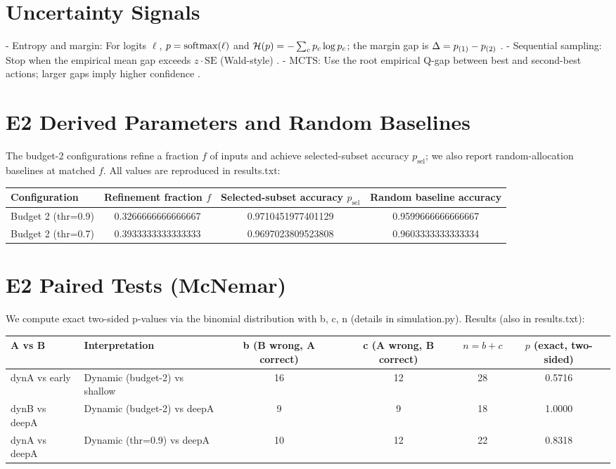 \appendix

\section{Uncertainty Signals}
\label{app:uncertainty}
- Entropy and margin: For logits $\ell$, $p=\mathrm{softmax}(\ell)$ and $\mathcal{H}(p)=-\sum_c p_c \log p_c$; the margin gap is $\Delta = p_{(1)}-p_{(2)}$ \cite{Guo2017Calibration,Kaya2019ShallowDeep}.
- Sequential sampling: Stop when the empirical mean gap exceeds $z \cdot \mathrm{SE}$ (Wald-style) \cite{Wald1945Sequential,Hoeffding1963}.
- MCTS: Use the root empirical Q-gap between best and second-best actions; larger gaps imply higher confidence \cite{Kocsis2006UCT,Coulom2006MCTS}.

\section{E2 Derived Parameters and Random Baselines}
\label{app:derived}
The budget-2 configurations refine a fraction $f$ of inputs and achieve selected-subset accuracy $p_{\mathrm{sel}}$; we also report random-allocation baselines at matched $f$. All values are reproduced in results.txt:
\begin{center}
\begin{adjustbox}{width=\linewidth}
\begin{tabular}{l c c c}
\toprule
Configuration & Refinement fraction $f$ & Selected-subset accuracy $p_{\mathrm{sel}}$ & Random baseline accuracy \\
\midrule
Budget 2 (thr=0.9) & 0.3266666666666667 & 0.9710451977401129 & 0.9599666666666667 \\
Budget 2 (thr=0.7) & 0.3933333333333333 & 0.9697023809523808 & 0.9603333333333334 \\
\bottomrule
\end{tabular}
\end{adjustbox}
\end{center}

\section{E2 Paired Tests (McNemar)}
We compute exact two-sided p-values via the binomial distribution with b, c, n (details in simulation.py). Results (also in results.txt):
\begin{center}
\begin{adjustbox}{width=\linewidth}
\begin{tabular}{l l c c c c}
\toprule
A vs B & Interpretation & b (B wrong, A correct) & c (A wrong, B correct) & $n=b+c$ & $p$ (exact, two-sided) \\
\midrule
dynA vs early & Dynamic (budget-2) vs shallow & 16 & 12 & 28 & 0.5716 \\
dynB vs deepA & Dynamic (budget-2) vs deepA    & 9  & 9  & 18 & 1.0000 \\
dynA vs deepA & Dynamic (thr=0.9) vs deepA     & 10 & 12 & 22 & 0.8318 \\
\bottomrule
\end{tabular}
\end{adjustbox}
\end{center}

